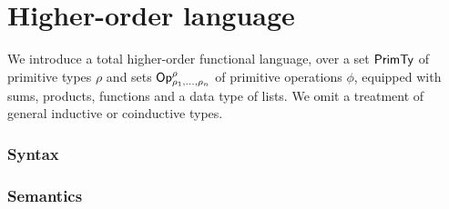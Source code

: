\section{Higher-order language}

We introduce a total higher-order functional language, over a set $\mathsf{PrimTy}$ of primitive types $\rho$ and sets
$\mathsf{Op}^\rho_{\rho_1,\ldots,\rho_n}$ of primitive operations $\phi$, equipped with sums, products, functions
and a data type of lists. We omit a treatment of general inductive or coinductive types.

\subsubsection{Syntax}
\label{sec:language:syntax}




\subsubsection{Semantics}
\label{sec:language:semantics}

% 
% 
%
%
